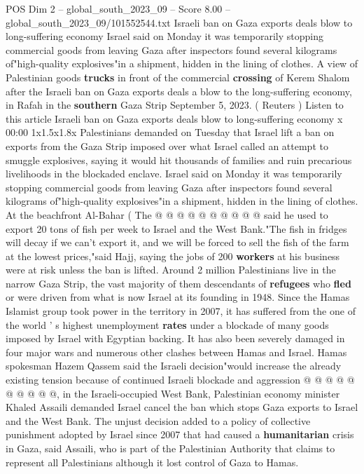 \begin{textsample}{POS Dim 2 – global\_south\_2023\_09 – Score 8.00 – global\_south\_2023\_09/101552544.txt}  \label{ex:f2_pos_443}
Israeli ban on Gaza exports deals blow to long-suffering economy Israel said on Monday it was temporarily stopping commercial goods from leaving Gaza after inspectors found several kilograms of"high-quality explosives"in a shipment, hidden in the lining of clothes.
A view of Palestinian goods \textbf{trucks} in front of the commercial \textbf{crossing} of Kerem Shalom after the Israeli ban on Gaza exports deals a blow to the long-suffering economy, in Rafah in the \textbf{southern} Gaza Strip September 5, 2023. ( Reuters ) Listen to this article Israeli ban on Gaza exports deals blow to long-suffering economy x 00:00 1x1.5x1.8x Palestinians demanded on Tuesday that Israel lift a ban on exports from the Gaza Strip imposed over what Israel called an attempt to smuggle explosives, saying it would hit thousands of families and ruin precarious livelihoods in the blockaded enclave.
Israel said on Monday it was temporarily stopping commercial goods from leaving Gaza after inspectors found several kilograms of"high-quality explosives"in a shipment, hidden in the lining of clothes.
At the beachfront Al-Bahar ( The @ @ @ @ @ @ @ @ @ @ said he used to export 20 tons of fish per week to Israel and the West Bank."The fish in fridges will decay if we can't export it, and we will be forced to sell the fish of the farm at the lowest prices,"said Hajj, saying the jobs of 200 \textbf{workers} at his business were at risk unless the ban is lifted.
Around 2 million Palestinians live in the narrow Gaza Strip, the vast majority of them descendants of \textbf{refugees} who \textbf{fled} or were driven from what is now Israel at its founding in 1948.
Since the Hamas Islamist group took power in the territory in 2007, it has suffered from the one of the world ' s highest unemployment \textbf{rates} under a blockade of many goods imposed by Israel with Egyptian backing.
It has also been severely damaged in four major wars and numerous other clashes between Hamas and Israel.
Hamas spokesman Hazem Qassem said the Israeli decision"would increase the already existing tension because of continued Israeli blockade and aggression @ @ @ @ @ @ @ @ @ @, in the Israeli-occupied West Bank, Palestinian economy minister Khaled Assaili demanded Israel cancel the ban which stops Gaza exports to Israel and the West Bank.
The unjust decision added to a policy of collective punishment adopted by Israel since 2007 that had caused a \textbf{humanitarian} crisis in Gaza, said Assaili, who is part of the Palestinian Authority that claims to represent all Palestinians although it lost control of Gaza to Hamas.

\end{textsample}
